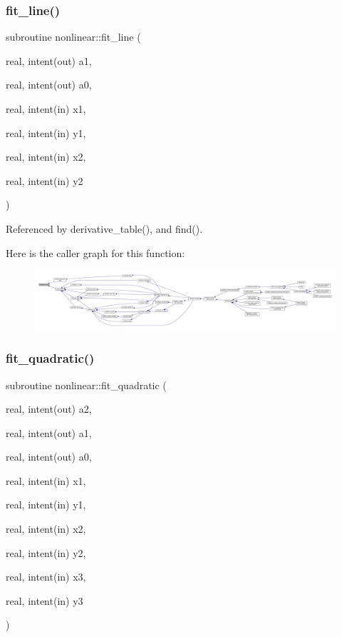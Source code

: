 \subsubsection{\texorpdfstring{fit\+\_\+line()}{fit\_line()}}
{\footnotesize\ttfamily subroutine nonlinear\+::fit\+\_\+line (\begin{DoxyParamCaption}\item[{real, intent(out)}]{a1,  }\item[{real, intent(out)}]{a0,  }\item[{real, intent(in)}]{x1,  }\item[{real, intent(in)}]{y1,  }\item[{real, intent(in)}]{x2,  }\item[{real, intent(in)}]{y2 }\end{DoxyParamCaption})\hspace{0.3cm}{\ttfamily [private]}}



Referenced by derivative\+\_\+table(), and find().

Here is the caller graph for this function\+:
\nopagebreak
\begin{figure}[H]
\begin{center}
\leavevmode
\includegraphics[width=350pt]{namespacenonlinear_a5754454991f9dfb61c4251267c2d175d_icgraph}
\end{center}
\end{figure}
\mbox{\label{namespacenonlinear_ade72d40a60522b6b609687fbe7e9ddbb}} 
\subsubsection{\texorpdfstring{fit\+\_\+quadratic()}{fit\_quadratic()}}
{\footnotesize\ttfamily subroutine nonlinear\+::fit\+\_\+quadratic (\begin{DoxyParamCaption}\item[{real, intent(out)}]{a2,  }\item[{real, intent(out)}]{a1,  }\item[{real, intent(out)}]{a0,  }\item[{real, intent(in)}]{x1,  }\item[{real, intent(in)}]{y1,  }\item[{real, intent(in)}]{x2,  }\item[{real, intent(in)}]{y2,  }\item[{real, intent(in)}]{x3,  }\item[{real, intent(in)}]{y3 }\end{DoxyParamCaption})\hspace{0.3cm}{\ttfamily [private]}}




